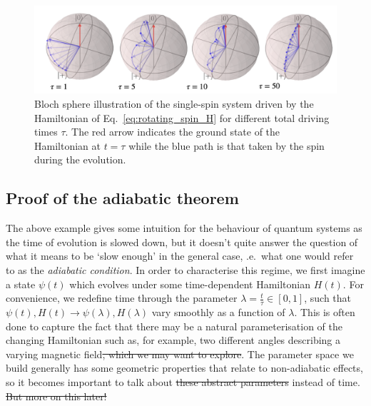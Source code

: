 \documentclass[a4paper,oneside,11pt]{book}
\providecommand{\DIFaddtex}[1]{{\protect\color{blue}\uwave{#1}}} %
\providecommand{\DIFdeltex}[1]{{\protect\color{red}\sout{#1}}}                      %
\providecommand{\DIFaddbegin}{} %
\providecommand{\DIFaddend}{} %
\providecommand{\DIFdelbegin}{} %
\providecommand{\DIFdelend}{} %
\providecommand{\DIFadd}[1]{\texorpdfstring{\DIFaddtex{#1}}{#1}} %
\providecommand{\DIFdel}[1]{\texorpdfstring{\DIFdeltex{#1}}{}} %
\newcommand{\DIFscaledelfig}{0.5}
\newlength{\DIFdelgraphicswidth} %
\newlength{\DIFdelgraphicsheight} %
\newcommand{\DIFaddincludegraphics}[2][]{{\color{blue}\fbox{\DIFOincludegraphics[#1]{#2}}}} %
\newcommand{\DIFdelincludegraphics}[2][]{%
\sbox{\DIFdelgraphicsbox}{\DIFOincludegraphics[#1]{#2}}%
\settoboxwidth{\DIFdelgraphicswidth}{\DIFdelgraphicsbox} %
\settoboxtotalheight{\DIFdelgraphicsheight}{\DIFdelgraphicsbox} %
\scalebox{\DIFscaledelfig}{%
\parbox[b]{\DIFdelgraphicswidth}{\usebox{\DIFdelgraphicsbox}\\[-\baselineskip] \rule{\DIFdelgraphicswidth}{0em}}\llap{\resizebox{\DIFdelgraphicswidth}{\DIFdelgraphicsheight}{%
\setlength{\unitlength}{\DIFdelgraphicswidth}%
\begin{picture}(1,1)%
\thicklines\linethickness{2pt} %
{\color[rgb]{1,0,0}\put(0,0){\framebox(1,1){}}}%
{\color[rgb]{1,0,0}\put(0,0){\line( 1,1){1}}}%
{\color[rgb]{1,0,0}\put(0,1){\line(1,-1){1}}}%
\end{picture}%
}\hspace*{3pt}}} %
} %
\DeclareRobustCommand{\DIFaddbegin}{\DIFOaddbegin \let\includegraphics\DIFaddincludegraphics} %
\DeclareRobustCommand{\DIFaddend}{\DIFOaddend \let\includegraphics\DIFOincludegraphics} %
\DeclareRobustCommand{\DIFdelbegin}{\DIFOdelbegin \let\includegraphics\DIFdelincludegraphics} %
\DeclareRobustCommand{\DIFdelend}{\DIFOaddend \let\includegraphics\DIFOincludegraphics} %
\begin{document}
    \begin{figure}[t]
    \centering
    \includegraphics[width=0.9\linewidth]{images/magnetic_field_spin.png} \caption[Rotating spin Bloch sphere illustrations]{Bloch sphere illustration of the single-spin system driven by the Hamiltonian of Eq.~\eqref{eq:rotating_spin_H} for different total driving times $\tau$. The red arrow indicates the ground state of the Hamiltonian at $t = \tau$ while the blue path is that taken by the spin during the evolution.}\label{fig:bloch_rotating_spin}
    \end{figure}

    \subsection{Proof of the adiabatic theorem}\label{sec:2.1.1_proof_adiabatic_theorem}

    The above example gives some intuition for the behaviour of quantum systems as the time of evolution is slowed down, but it doesn't quite answer the question of what it means to be `slow enough' in the general case, \@i.e.~what one would refer to as the \emph{adiabatic condition}. In order to characterise this regime, we first imagine a state \DIFdelbegin \DIFdel{$\psi(t)$ }\DIFdelend \DIFaddbegin \DIFadd{$\ket{\psi(t)}$ }\DIFaddend which evolves under some time-dependent Hamiltonian $H(t)$. For convenience, we redefine time through the parameter $\lambda = \frac{t}{\tau} \in [0,1]$, such that $\psi(t), H(t) \rightarrow \psi(\lambda), H(\lambda)$ vary smoothly as a function of $\lambda$. This is often done to capture the fact that there may be a natural parameterisation of the changing Hamiltonian such as, for example, two different angles describing a varying magnetic field\DIFdelbegin \DIFdel{, which we may want to explore}\DIFdelend . The parameter space we build generally has some geometric properties that relate to non-adiabatic effects, so it becomes important to talk about \DIFdelbegin \DIFdel{these abstract parameters }\DIFdelend \DIFaddbegin \DIFadd{abstract parameters like $\lambda$ }\DIFaddend instead of time.
    \DIFdelbegin \DIFdel{But more on this later!
    }\DIFdelend 
\end{document}
